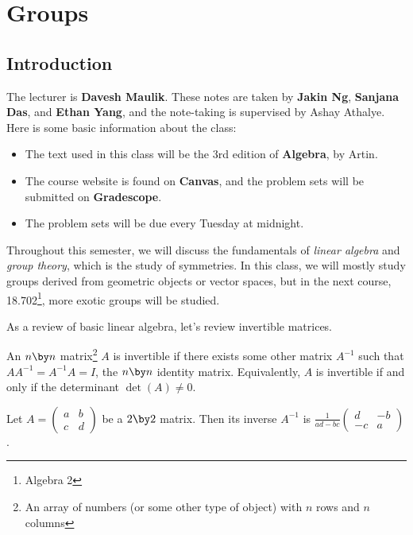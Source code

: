
\section{Groups}
\subsection{Introduction}
The lecturer is \textbf{Davesh Maulik}. These notes are taken by \textbf{Jakin Ng}, \textbf{Sanjana Das}, and \textbf{Ethan Yang}, and
the note-taking is supervised by Ashay Athalye. Here is some basic information about the class:
\begin{itemize}
    \item The text used in this class will be the 3rd edition of \textbf{Algebra}, by Artin. 

    \item The course website is found on \textbf{Canvas}, and the problem sets will be submitted on \textbf{Gradescope}. 
    
    \item The problem sets will be due every Tuesday at midnight.
\end{itemize}

Throughout this semester, we will discuss the fundamentals of \emph{linear algebra} and \emph{group theory}, which is the study of symmetries. In this class, we will mostly study groups derived from geometric objects or vector spaces, but in the next course, 18.702\footnote{Algebra 2}, more exotic groups will be studied. 

As a review of basic linear algebra, let's review invertible matrices.

\begin{definition}
An $n \by n$ matrix\footnote{An array of numbers (or some other type of object) with $n$ rows and $n$ columns} $A$ is invertible if there exists some other matrix $A^{-1}$ such that $AA^{-1} = A^{-1}A = I$, the $n \by n$ identity matrix. Equivalently, $A$ is invertible if and only if the determinant $\det(A) \neq 0.$  
\end{definition}

\begin{example}[$n = 2$]
Let $A = \begin{pmatrix}a & b \\ c & d\end{pmatrix}$ be a $2 \by 2$ matrix. Then its inverse $A^{-1}$ is $\frac{1}{ad-bc}\begin{pmatrix}
d & -b \\ -c & a
\end{pmatrix}$.
\end{example}

